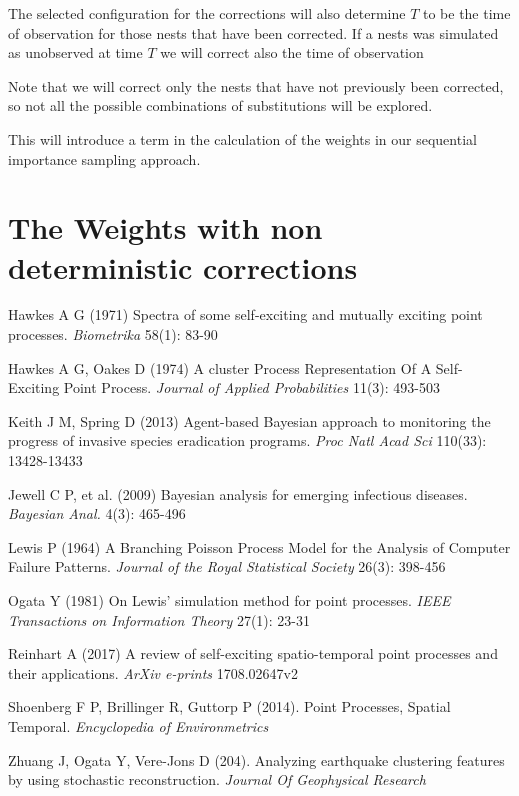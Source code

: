 \documentclass[11pt,a4paper]{article}
\begin{document}
{The selected configuration for the corrections will also determine $T$ to be the time of observation for those nests that have been corrected. If a nests was simulated as unobserved at time $T$ we will correct also the time of observation

Note that we will correct only the nests that have not previously been corrected, so not all the possible combinations of substitutions will be explored.



This will introduce a term in the calculation of the weights in our sequential importance sampling approach.

\section{The Weights with non deterministic corrections}
}

\begin{thebibliography}{99}

 Hawkes A G (1971) Spectra of some self-exciting and mutually exciting point processes. \textit{Biometrika} 58(1): 83-90

 Hawkes A G, Oakes D (1974) A cluster Process Representation Of A Self-Exciting Point Process. \textit{Journal of Applied Probabilities} 11(3): 493-503

 Keith J M, Spring D (2013) Agent-based Bayesian approach to monitoring the progress of invasive species eradication programs. \textit{Proc Natl Acad Sci} 110(33): 13428-13433

 Jewell C P, et al. (2009) Bayesian analysis for emerging infectious diseases. \textit{Bayesian Anal.} 4(3): 465-496

 Lewis P (1964) A Branching Poisson Process Model for the Analysis of Computer Failure Patterns. \textit{Journal of the Royal Statistical Society} 26(3): 398-456

 Ogata Y (1981) On Lewis' simulation method for point processes. \textit{IEEE Transactions on Information Theory} 27(1): 23-31

 Reinhart A (2017) A review of self-exciting spatio-temporal point processes and their applications. \textit{ArXiv e-prints} 1708.02647v2

 Shoenberg F P, Brillinger R, Guttorp P (2014). Point Processes, Spatial Temporal. \textit{Encyclopedia of Environmetrics}

 Zhuang J, Ogata Y, Vere-Jons D (204). Analyzing earthquake clustering features by using stochastic reconstruction. \textit{Journal Of Geophysical Research}

\end{thebibliography}
\end{document}
